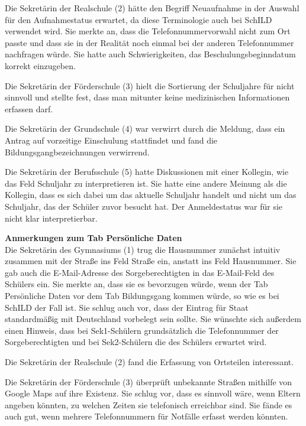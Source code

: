 Die Sekretärin der Realschule (2) hätte den Begriff \glqq Neuaufnahme\grqq{} in der Auswahl für den Aufnahmestatus erwartet, da diese Terminologie auch bei \glqq SchILD\grqq{} verwendet wird. Sie merkte an, dass die Telefonnummervorwahl nicht zum Ort passte und dass sie in der Realität noch einmal bei der anderen Telefonnummer nachfragen würde. Sie hatte auch Schwierigkeiten, das Beschulungsbeginndatum korrekt einzugeben.

Die Sekretärin der Förderschule (3) hielt die Sortierung der Schuljahre für nicht sinnvoll und stellte fest, dass man mitunter keine medizinischen Informationen erfassen darf.

Die Sekretärin der Grundschule (4) war verwirrt durch die Meldung, dass ein Antrag auf vorzeitige Einschulung stattfindet und fand die Bildungsgangbezeichnungen verwirrend.

Die Sekretärin der Berufsschule (5) hatte Diskussionen mit einer Kollegin, wie das Feld \glqq Schuljahr\grqq{} zu interpretieren ist. Sie hatte eine andere Meinung als die Kollegin, dass es sich dabei um das aktuelle Schuljahr handelt und nicht um das Schuljahr, das der Schüler zuvor besucht hat. Der Anmeldestatus war für sie nicht klar interpretierbar.

\textbf{Anmerkungen zum Tab \glqq Persönliche Daten\grqq{}}\\
Die Sekretärin des Gymnasiums (1) trug die Hausnummer zunächst intuitiv zusammen mit der Straße ins Feld \glqq Straße\grqq{} ein, anstatt ins Feld \glqq Hausnummer\grqq{}. Sie gab auch die E-Mail-Adresse des Sorgeberechtigten in das E-Mail-Feld des Schülers ein. Sie merkte an, dass sie es bevorzugen würde, wenn der Tab \glqq Persönliche Daten\grqq{} vor dem Tab \glqq Bildungsgang\grqq{} kommen würde, so wie es bei \glqq SchILD\grqq{} der Fall ist. Sie schlug auch vor, dass der Eintrag für \glqq Staat\grqq{} standardmäßig mit \glqq Deutschland\grqq{} vorbelegt sein sollte. Sie wünschte sich außerdem einen Hinweis, dass bei Sek1-Schülern grundsätzlich die Telefonnummer der Sorgeberechtigten und bei Sek2-Schülern die des Schülers erwartet wird.

Die Sekretärin der Realschule (2) fand die Erfassung von Ortsteilen interessant.

Die Sekretärin der Förderschule (3) überprüft unbekannte Straßen mithilfe von Google Maps auf ihre Existenz. Sie schlug vor, dass es sinnvoll wäre, wenn Eltern angeben könnten, zu welchen Zeiten sie telefonisch erreichbar sind. Sie fände es auch gut, wenn mehrere Telefonnummern für Notfälle erfasst werden könnten.

